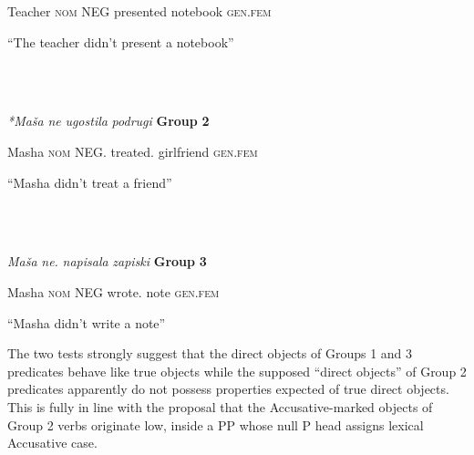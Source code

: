 \documentclass[output=paper,modfonts, nonflat]{langsci/langscibook}
\begin{document}
\begin{styleinnerExample}
  Teacher \textsc{nom} NEG presented notebook \textsc{gen.fem}
\end{styleinnerExample}

\begin{styleinnerExample}
  “The teacher didn’t present a notebook”
\end{styleinnerExample}

\begin{styleinnerExample}
\ea%
    \label{ex:key:26}
    \gll\\
        \\
    \glt
    \z

          \textit{*Maša}           \textit{ne}        \textit{ugostila} \textit{podrugi}   \textbf{Group} \textbf{2}
\end{styleinnerExample}

\begin{styleinnerExample}
  Masha \textsc{nom}   NEG.  treated.  girlfriend \textsc{gen.fem}
\end{styleinnerExample}

\begin{styleinnerExample}
  “Masha didn’t treat a friend”
\end{styleinnerExample}

\begin{styleinnerExample}
\ea%
    \label{ex:key:27}
    \gll\\
        \\
    \glt
    \z

          \textit{Maša}            \textit{ne.}     \textit{napisala} \textit{zapiski}     \textbf{Group} \textbf{3}
\end{styleinnerExample}

\begin{styleinnerExample}
  Masha \textsc{nom}  NEG wrote.      note \textsc{gen.fem}
\end{styleinnerExample}

\begin{styleinnerExample}
  “Masha didn’t write a note”
\end{styleinnerExample}

The two tests strongly suggest that the direct objects of Groups 1 and 3 predicates behave like true objects while the supposed “direct objects” of Group 2 predicates apparently do not possess properties expected of true direct objects. This is fully in line with the proposal that the Accusative-marked objects of Group 2 verbs originate low, inside a PP whose null P head assigns lexical Accusative case. 
\end{document}
